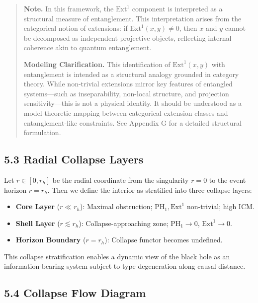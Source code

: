 \documentclass[11pt]{article}
\begin{document}
\begin{quote}
\textbf{Note.} In this framework, the $\mathrm{Ext}^1$ component is interpreted as a structural measure of entanglement. This interpretation arises from the categorical notion of extensions: if $\mathrm{Ext}^1(x, y) \neq 0$, then $x$ and $y$ cannot be decomposed as independent projective objects, reflecting internal coherence akin to quantum entanglement.

\textbf{Modeling Clarification.} This identification of $\mathrm{Ext}^1(x, y)$ with entanglement is intended as a structural analogy grounded in category theory. While non-trivial extensions mirror key features of entangled systems—such as inseparability, non-local structure, and projection sensitivity—this is not a physical identity. It should be understood as a model-theoretic mapping between categorical extension classes and entanglement-like constraints. See Appendix G for a detailed structural formulation.
\end{quote}




\subsection*{5.3 Radial Collapse Layers}

Let \( r \in [0, r_h] \) be the radial coordinate from the singularity \( r = 0 \) to the event horizon \( r = r_h \). Then we define the interior as stratified into three collapse layers:

\begin{itemize}
    \item \textbf{Core Layer} (\( r \ll r_h \)): Maximal obstruction; \(\mathrm{PH}_1, \mathrm{Ext}^1\) non-trivial; high ICM.
    \item \textbf{Shell Layer} (\( r \lesssim r_h \)): Collapse-approaching zone; \(\mathrm{PH}_1 \to 0\), \(\mathrm{Ext}^1 \to 0\).
    \item \textbf{Horizon Boundary} (\( r = r_h \)): Collapse functor becomes undefined.
\end{itemize}

This collapse stratification enables a dynamic view of the black hole as an information-bearing system subject to type degeneration along causal distance.

\subsection*{5.4 Collapse Flow Diagram}
\end{document}
